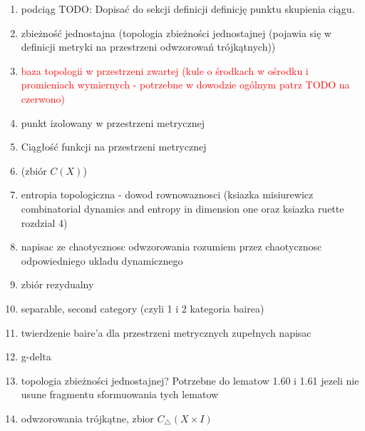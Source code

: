 \documentclass[licencjacka]{pwr_wmat_praca_dyplomowa}
\theoremstyle{plain}
\numberwithin{theorem}{chapter}
\theoremstyle{definition}
\numberwithin{theorem}{chapter}
\begin{document}
\begin{enumerate}

\item podciąg
TODO: Dopisać do sekcji definicji definicję punktu skupienia ciągu.

\item zbieżność jednostajna (topologia zbieżności jednostajnej (pojawia się w definicji metryki na przestrzeni odwzorowań trójkątnych))



\item \textcolor{red}{baza topologii w przestrzeni zwartej (kule o środkach w ośrodku i promieniach wymiernych - potrzebne w dowodzie ogólnym patrz TODO na czerwono)}
\item punkt izolowany w przestrzeni metrycznej


\item Ciągłość funkcji na przestrzeni metrycznej 
\item (zbiór $C(X)$)






\item entropia topologiczna - dowod rownowaznosci (ksiazka misiurewicz combinatorial dynamics and entropy in dimension one oraz ksiazka ruette rozdzial 4)



\item napisac ze chaotycznosc odwzorowania rozumiem przez chaotycznosc odpowiedniego ukladu dynamicznego

\item zbiór rezydualny
\item separable, second category (czyli 1 i 2 kategoria bairea)
\item twierdzenie baire'a dla przestrzeni metrycznych zupełnych napisac
\item g-delta
\item topologia zbieżności jednostajnej? Potrzebne do lematow 1.60 i 1.61 jezeli nie usune fragmentu sformuowania tych lematow




\item odwzorowania trójkątne, zbior $C_\triangle(X \times I)$

\end{enumerate}
\end{document}

